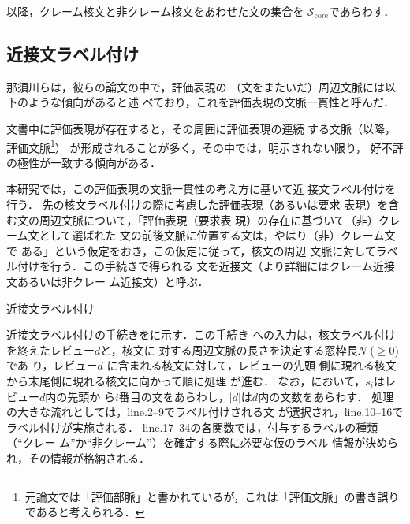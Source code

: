 \documentclass[japanese]{jnlp_1.4}
\let\underline
\def\algo#1{}
\begin{document}


以降，クレーム核文と非クレーム核文をあわせた文の集合を
$\mathcal{S}_\mathrm{core}$であらわす．



\subsection{近接文ラベル付け}
\label{sec:data_context}

那須川ら\cite{nasukawa}は，彼らの論文の中で，評価表現の
（文をまたいだ）周辺文脈には以下のような傾向があると述
べており，これを評価表現の文脈一貫性と呼んだ．

{\setlength{\leftskip}{3zw}\noindent
文書中に評価表現が存在すると，その周囲に評価表現の連続
する文脈（以降，評価文脈\footnote{
元論文では「評価部脈」と書かれているが，これは「評価文脈」の書き誤りであると考えられる．}）
が形成されることが多く，その中では，明示されない限り，
好不評の極性が一致する傾向がある．
\par}


本研究では，この評価表現の文脈一貫性の考え方に基いて近
接文ラベル付けを行う．
先の核文ラベル付けの際に考慮した評価表現（あるいは要求
  表現）を含む文の周辺文脈について，「評価表現（要求表
    現）の存在に基づいて（非）クレーム文として選ばれた
  文の前後文脈に位置する文は，やはり（非）クレーム文で
  ある」という仮定をおき，この仮定に従って，核文の周辺
文脈に対してラベル付けを行う．この手続きで得られる
文を近接文（より詳細にはクレーム近接文あるいは非クレー
  ム近接文）と呼ぶ．

\begin{algorithm}[b]
 \caption{近接文ラベル付け}
 \label{algo:alg1}

\end{algorithm}

近接文ラベル付けの手続きをに示す．この手続き
への入力は，核文ラベル付けを終えたレビュー$d$と，核文に
対する周辺文脈の長さを決定する窓枠長$N$ ($ \ge 0$) であ
り，レビュー$d$ に含まれる核文に対して，レビューの先頭
側に現れる核文から末尾側に現れる核文に向かって順に処理
が進む．
なお，において，$s_i$はレビュー$d$内の先頭か
ら$i$番目の文をあらわし，$|d|$は$d$内の文数をあらわす．
処理の大きな流れとしては，line.2--9でラベル付けされる文
が選択され，line.10--16でラベル付けが実施される．
line.17--34の各関数では，付与するラベルの種類（``クレー
  ム''か``非クレーム''）を確定する際に必要な仮のラベル
情報が決められ，その情報が格納される．
\end{document}
